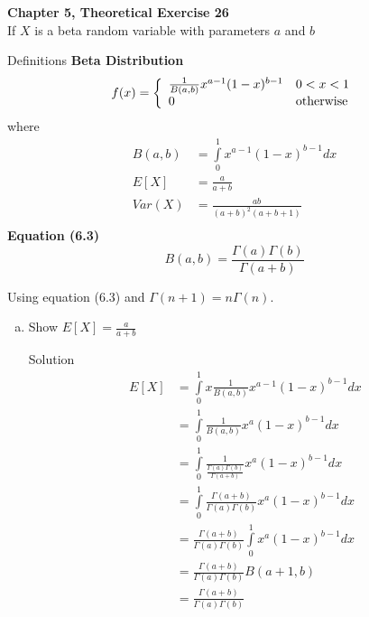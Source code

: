 \documentclass{article}
\begin{document}
\begin{spacing}{1.1}
\newpage
\begin{homeworkProblem}
  {\bf Chapter 5, Theoretical Exercise 26}\\
  If $X$ is a beta random variable with parameters $a$ and $b$  
  \begin{homeworkSection}{Definitions}
    {\bf Beta Distribution}\\
      \[
        f( x) = 
        \left\{ \begin{array}{l l}
          \frac{ 1}{ B(a, b)} x^{a - 1} (1 - x)^{b - 1} &0 < x < 1\\
          0 & \text{otherwise}
        \end{array} \right.
      \]
      where
      \begin{align*}
        B(a, b) &= \int\limits_0^1 x^{a -1} (1 - x)^{b - 1} d x\\
        E[ X] &= \frac{ a}{ a + b}\\
        Var( X) &= \frac{ ab}{ (a + b)^2 (a + b + 1)}\\
      \end{align*}
    {\bf Equation (6.3)}\\
        \[B( a, b) = \frac{ \Gamma( a) \Gamma( b)}{ \Gamma( a + b)}\]
  \end{homeworkSection}
  Using equation (6.3) and $\Gamma( n + 1) = n \Gamma( n)$.
  \begin{enumerate}[(a)]
    \item Show $E[ X] = \frac{ a}{ a + b}$
      \begin{homeworkSection}{Solution}
        \begin{align*}
          E[X] &= \int\limits_0^1 x \frac{ 1}{ B(a, b)} x^{a - 1} (1 - x)^{b - 1} dx\\
          &= \int\limits_0^1 \frac{ 1}{ B(a, b)} x^{a} (1 - x)^{b - 1} dx\\
          &= \int\limits_0^1 \frac{ 1}{ \frac{ \Gamma( a) \Gamma( b)}{ \Gamma( a + b)}} 
              x^{a} (1 - x)^{b - 1} dx\\
          &= \int\limits_0^1 \frac{ \Gamma( a + b)}{ \Gamma( a) \Gamma( b)} 
              x^{a} (1 - x)^{b - 1} dx\\
          &= \frac{\Gamma( a + b)}{ \Gamma( a) \Gamma( b)} \int\limits_0^1
              x^{a} (1 - x)^{b - 1} dx\\
          &= \frac{ \Gamma( a + b)}{ \Gamma( a) \Gamma( b)} B(a + 1, b)\\
          &= \frac{ \Gamma( a + b)}{ \Gamma( a) \Gamma( b)} 

\end{align*}
\end{homeworkSection}
\end{enumerate}
\end{homeworkProblem}
\end{spacing}
\end{document}
